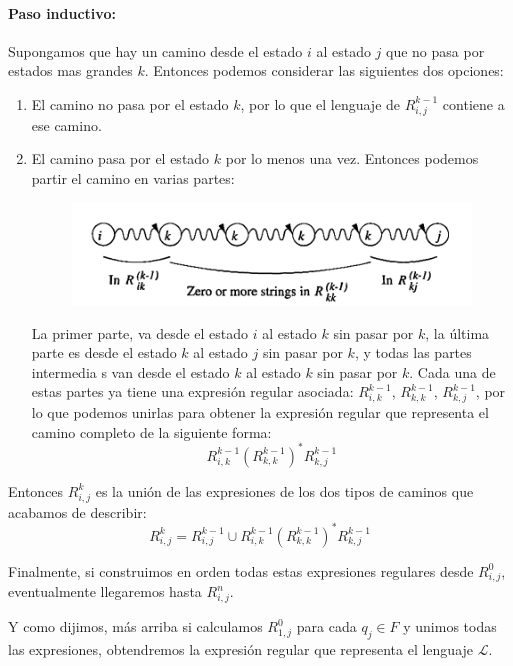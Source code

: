 \paragraph{Paso inductivo:} Supongamos que hay un camino desde el estado \(i\) al estado \(j\) que no pasa por estados mas grandes \(k\). Entonces podemos considerar las siguientes dos opciones:
\begin{enumerate}
  \item El camino no pasa por el estado \(k\), por lo que el lenguaje de \(R^{k-1}_{i,j}\) contiene a ese camino.
  \item El camino pasa por el estado \(k\) por lo menos una vez. Entonces podemos partir el camino en varias partes:
        \begin{figure}[H]
          \begin{center}
            \includegraphics[scale=0.75]{imagenes/afd_regular.png}
          \end{center}
        \end{figure}
        La primer parte, va desde el estado \(i\) al estado \(k\) sin pasar por \(k\), la última parte es desde el estado \(k\) al estado \(j\) sin pasar por \(k\), y todas las partes intermedia s van desde el estado \(k\) al estado \(k\) sin pasar por \(k\). Cada una de estas partes ya tiene una expresión regular asociada: \(R^{k-1}_{i,k}\), \(R^{k-1}_{k,k}\), \(R^{k-1}_{k,j}\), por lo que podemos unirlas para obtener la expresión regular que representa el camino completo de la siguiente forma:
        \[
          R^{k-1}_{i,k}\left(R^{k-1}_{k,k}\right)^*R^{k-1}_{k,j}
        \]
\end{enumerate}

Entonces \(R^k_{i,j}\) es la unión de las expresiones de los dos tipos de caminos que acabamos de describir:
\[
  R^k_{i,j} = R^{k-1}_{i,j} \cup R^{k-1}_{i,k}\left(R^{k-1}_{k,k}\right)^*R^{k-1}_{k,j}
\]

Finalmente, si construimos en orden todas estas expresiones regulares desde \(R^0_{i,j}\), eventualmente llegaremos hasta \(R^n_{i,j}\).

Y como dijimos, más arriba si calculamos \(R^0_{1,j}\) para cada \(q_j\in F\) y unimos todas las expresiones, obtendremos la expresión regular que representa el lenguaje \(\mathcal{L}\).

